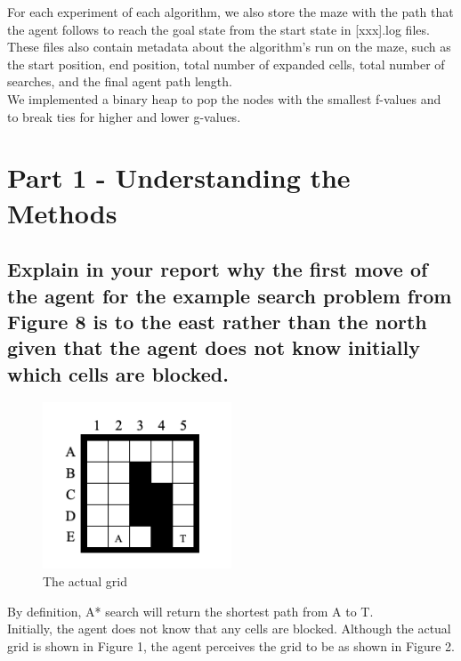 \documentclass{article}
\begin{document}
For each experiment of each algorithm, we also store the maze with the path that the agent follows to reach the goal state from the start state in [xxx].log files. These files also contain metadata about the algorithm's run on the maze, such as the start position, end position, total number of expanded cells, total number of searches, and the final agent path length. \\

We implemented a binary heap to pop the nodes with the smallest f-values and to break ties for higher and lower g-values.

\section{Part 1 - Understanding the Methods}

\subsection{Explain in your report why the first move of the agent for the example search problem from Figure 8 is to the east rather
than the north given that the agent does not know initially which cells are blocked.}

\begin{figure}[h!]
  \includegraphics[width=0.5\textwidth]{p1_0.png}
  \caption{The actual grid }
\end{figure}

By definition, A* search will return the shortest path from A to T.\\

Initially, the agent does not know that any cells are blocked. Although the actual grid is shown in Figure 1, the agent perceives the grid to be as shown in Figure 2.  \\
\end{document}
